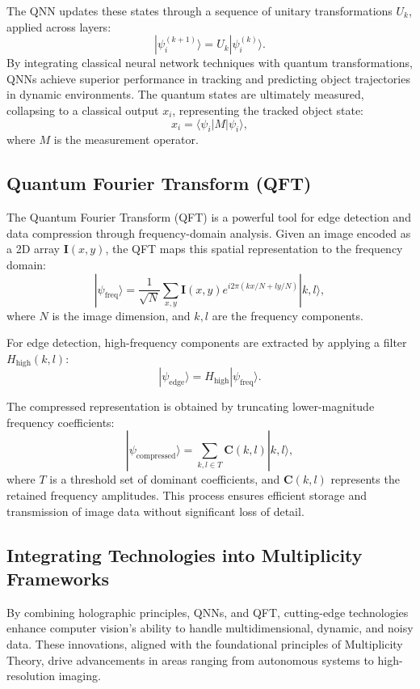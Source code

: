 \documentclass{article}
\theoremstyle{plain}
\begin{document}
The QNN updates these states through a sequence of unitary transformations \( U_k \), applied across layers:
\begin{equation}
|\psi_i^{(k+1)}\rangle = U_k |\psi_i^{(k)}\rangle.
\end{equation}
By integrating classical neural network techniques with quantum transformations, QNNs achieve superior performance in tracking and predicting object trajectories in dynamic environments. The quantum states are ultimately measured, collapsing to a classical output \( x_i \), representing the tracked object state:
\begin{equation}
x_i = \langle \psi_i | M | \psi_i \rangle,
\end{equation}
where \( M \) is the measurement operator.

\subsection{Quantum Fourier Transform (QFT)}
The Quantum Fourier Transform (QFT) is a powerful tool for edge detection and data compression through frequency-domain analysis. Given an image encoded as a 2D array \( \mathbf{I}(x, y) \), the QFT maps this spatial representation to the frequency domain:
\begin{equation}
|\psi_{\text{freq}}\rangle = \frac{1}{\sqrt{N}} \sum_{x, y} \mathbf{I}(x, y) e^{i 2 \pi (kx / N + ly / N)} |k, l\rangle,
\end{equation}
where \( N \) is the image dimension, and \( k, l \) are the frequency components. 

For edge detection, high-frequency components are extracted by applying a filter \( H_{\text{high}}(k, l) \):
\begin{equation}
|\psi_{\text{edge}}\rangle = H_{\text{high}} |\psi_{\text{freq}}\rangle.
\end{equation}

The compressed representation is obtained by truncating lower-magnitude frequency coefficients:
\begin{equation}
|\psi_{\text{compressed}}\rangle = \sum_{k, l \in T} \mathbf{C}(k, l) |k, l\rangle,
\end{equation}
where \( T \) is a threshold set of dominant coefficients, and \( \mathbf{C}(k, l) \) represents the retained frequency amplitudes. This process ensures efficient storage and transmission of image data without significant loss of detail.

\subsection{Integrating Technologies into Multiplicity Frameworks}
By combining holographic principles, QNNs, and QFT, cutting-edge technologies enhance computer vision's ability to handle multidimensional, dynamic, and noisy data. These innovations, aligned with the foundational principles of Multiplicity Theory, drive advancements in areas ranging from autonomous systems to high-resolution imaging.
\end{document}
